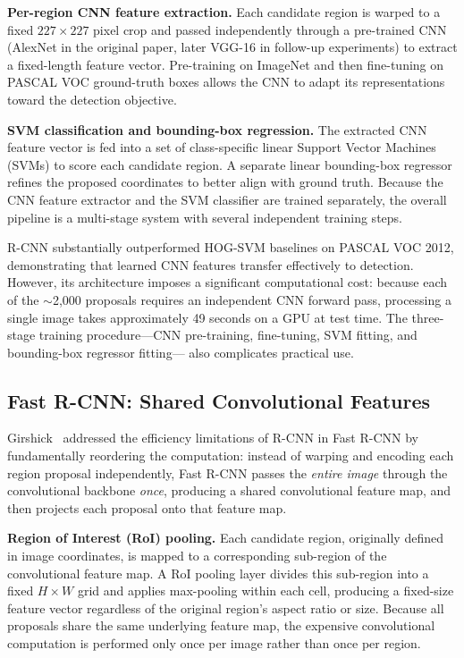 \textbf{Per-region CNN feature extraction.}
Each candidate region is warped to a fixed $227 \times 227$ pixel
crop and passed independently through a pre-trained CNN (AlexNet
in the original paper, later VGG-16 in follow-up experiments)
to extract a fixed-length feature vector. Pre-training on
ImageNet and then fine-tuning on PASCAL VOC ground-truth boxes
allows the CNN to adapt its representations toward the detection
objective.

\textbf{SVM classification and bounding-box regression.}
The extracted CNN feature vector is fed into a set of
class-specific linear Support Vector Machines (SVMs) to score
each candidate region. A separate linear bounding-box regressor
refines the proposed coordinates to better align with ground
truth. Because the CNN feature extractor and the SVM classifier
are trained separately, the overall pipeline is a multi-stage
system with several independent training steps.

R-CNN substantially outperformed HOG-SVM baselines on PASCAL
VOC 2012, demonstrating that learned CNN features transfer
effectively to detection. However, its architecture imposes a
significant computational cost: because each of the $\sim$2,000
proposals requires an independent CNN forward pass, processing
a single image takes approximately 49 seconds on a GPU at test
time. The three-stage training procedure---CNN pre-training,
fine-tuning, SVM fitting, and bounding-box regressor fitting---
also complicates practical use.

\subsection{Fast R-CNN: Shared Convolutional Features}

Girshick~\cite{girshick2015fastrcnn} addressed the efficiency
limitations of R-CNN in Fast R-CNN by fundamentally reordering
the computation: instead of warping and encoding each region
proposal independently, Fast R-CNN passes the \emph{entire
image} through the convolutional backbone \emph{once},
producing a shared convolutional feature map, and then projects
each proposal onto that feature map.

\textbf{Region of Interest (RoI) pooling.}
Each candidate region, originally defined in image coordinates,
is mapped to a corresponding sub-region of the convolutional
feature map. A RoI pooling layer divides this sub-region into
a fixed $H \times W$ grid and applies max-pooling within each
cell, producing a fixed-size feature vector regardless of the
original region's aspect ratio or size. Because all proposals
share the same underlying feature map, the expensive
convolutional computation is performed only once per image
rather than once per region.

